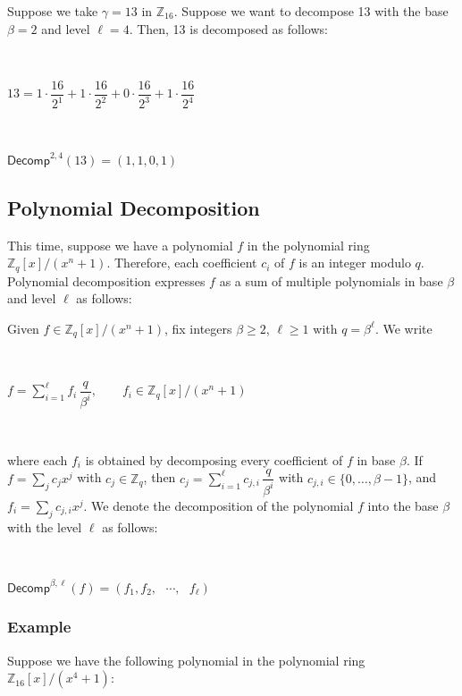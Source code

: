 Suppose we take $\gamma=13$ in $\mathbb{Z}_{16}$. Suppose we want to decompose 13 with the base $\beta = 2$ and level $\ell = 4$. Then, 13 is decomposed as follows:

$ $

$13 = 1 \cdot \dfrac{16}{2^1} + 1 \cdot \dfrac{16}{2^2} + 0 \cdot \dfrac{16}{2^3} + 1 \cdot \dfrac{16}{2^4}$

$ $

$\textsf{Decomp}^{2, 4}(13) = (1, 1, 0, 1)$


\subsection{Polynomial Decomposition}
\label{subsec:poly-decomp}

This time, suppose we have a polynomial $f$ in the polynomial ring ${\mathbb{Z}_q[x] / (x^n + 1)}$. Therefore, each coefficient $c_i$ of $f$ is an integer modulo $q$. Polynomial decomposition expresses $f$ as a sum of multiple polynomials in base $\beta$ and level $\ell$ as follows:


\begin{tcolorbox}[title={\textbf{\tboxlabel{\ref*{subsec:poly-decomp}} Polynomial Decomposition}}]

Given $f\in \mathbb{Z}_q[x]/(x^n+1)$, fix integers $\beta\ge2$, $\ell\ge1$ with $q=\beta^\ell$. We write

$ $

$
f=\sum\limits_{i=1}^{\ell} f_i\,\dfrac{q}{\beta^i}, \qquad f_i\in \mathbb{Z}_q[x]/(x^n+1)
$

$ $

where each $f_i$ is obtained by decomposing every coefficient of $f$ in base $\beta$. If $f=\sum\limits_j c_j x^j$ with $c_j\in\mathbb{Z}_q$, then
$c_j=\sum\limits_{i=1}^{\ell} c_{j,i}\,\dfrac{q}{\beta^i}$ with $c_{j,i}\in\{0,\ldots,\beta-1\}$,
and $f_i=\sum_j c_{j,i} x^j$.
We denote the decomposition of the polynomial $f$ into the base $\beta$ with the level $\ell$ as follows:

$ $

$\textsf{Decomp}^{\beta, \ell}(f) = (f_1, f_2, \text{ } \cdots , \text{ } f_\ell)$
 $ $
\end{tcolorbox}




\subsubsection{Example}

Suppose we have the following polynomial in the polynomial ring $\mathbb{Z}_{16}[x] / (x^4 + 1)$:

